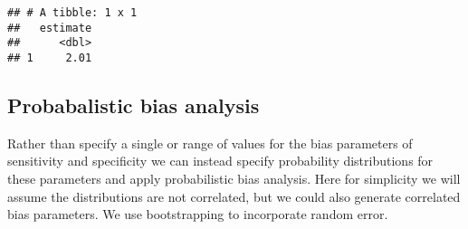 \documentclass[
]{book}
\begin{document}
\begin{verbatim}
## # A tibble: 1 x 1
##   estimate
##      <dbl>
## 1     2.01
\end{verbatim}

\hypertarget{probabalistic-bias-analysis}{%
\subsection{Probabalistic bias analysis}\label{probabalistic-bias-analysis}}

Rather than specify a single or range of values for the bias parameters of sensitivity and specificity we can instead specify probability distributions for these parameters and apply probabilistic bias analysis. Here for simplicity we will assume the distributions are not correlated, but we could also generate correlated bias parameters.\citep{fox2022applying} We use bootstrapping to incorporate random error.
\end{document}
